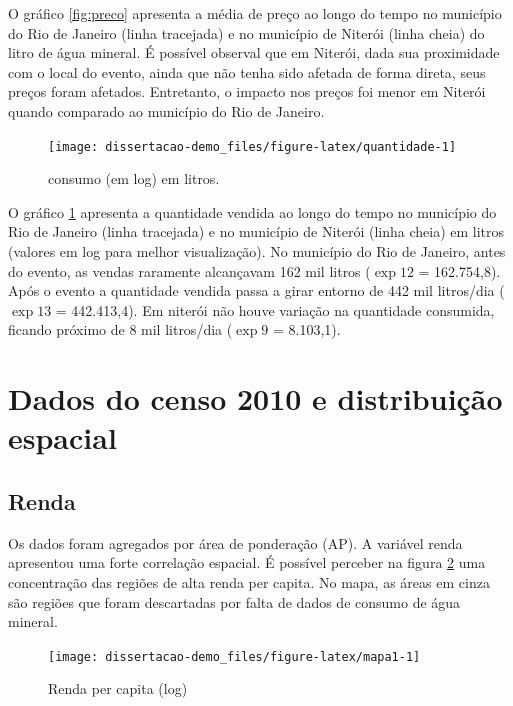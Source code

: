 \documentclass[
  12pt,
]{book}
\begin{document}
O gráfico \ref{fig:preco} apresenta a média de preço ao longo do tempo no município do Rio de Janeiro (linha tracejada) e no município de Niterói (linha cheia) do litro de água mineral. É possível observal que em Niterói, dada sua proximidade com o local do evento, ainda que não tenha sido afetada de forma direta, seus preços foram afetados. Entretanto, o impacto nos preços foi menor em Niterói quando comparado ao município do Rio de Janeiro.

\begin{figure}

{\centering \texttt{[image: dissertacao-demo\_files/figure-latex/quantidade-1]} 

}

\caption{consumo (em log) em litros.}\label{fig:quantidade}
\end{figure}

O gráfico \ref{fig:quantidade} apresenta a quantidade vendida ao longo do tempo no município do Rio de Janeiro (linha tracejada) e no município de Niterói (linha cheia) em litros (valores em log para melhor visualização). No município do Rio de Janeiro, antes do evento, as vendas raramente alcançavam 162 mil litros (\(\exp{12}\) = 162.754,8). Após o evento a quantidade vendida passa a girar entorno de 442 mil litros/dia (\(\exp{13}\) = 442.413,4). Em niterói não houve variação na quantidade consumida, ficando próximo de 8 mil litros/dia (\(\exp{9}\) = 8.103,1).

\hypertarget{dados-do-censo-2010-e-distribuiuxe7uxe3o-espacial}{%
\section{Dados do censo 2010 e distribuição espacial}\label{dados-do-censo-2010-e-distribuiuxe7uxe3o-espacial}}

\hypertarget{renda}{%
\subsection{Renda}\label{renda}}

Os dados foram agregados por área de ponderação (AP). A variável renda apresentou uma forte correlação espacial. É possível perceber na figura \ref{fig:mapa1} uma concentração das regiões de alta renda per capita. No mapa, as áreas em cinza são regiões que foram descartadas por falta de dados de consumo de água mineral.

\begin{figure}

{\centering \texttt{[image: dissertacao-demo\_files/figure-latex/mapa1-1]} 

}

\caption{Renda per capita (log)}\label{fig:mapa1}
\end{figure}
\end{document}
